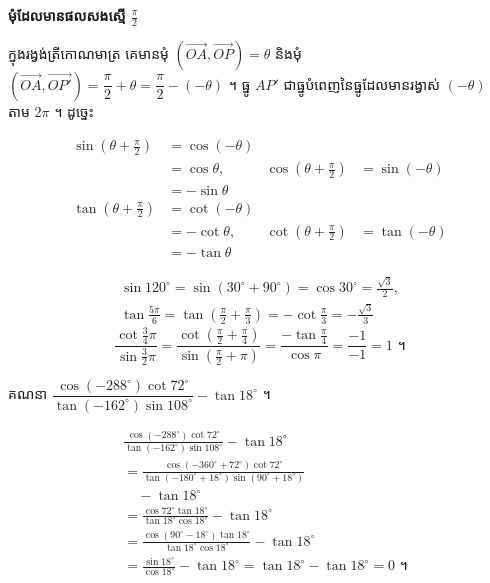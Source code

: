 \textbf{មុំដែលមានផលសងស្មើ $\frac{\pi}{2}$}

ក្នុងរង្វង់ត្រីកោណមាត្រ គេមានមុំ $(\overrightarrow{OA}, \overrightarrow{OP}) = \theta$ និងមុំ $(\overrightarrow{OA}, \overrightarrow{OP'}) = \dfrac{\pi}{2} + \theta = \dfrac{\pi}{2} - (-\theta)$ ។ ធ្នូ $AP'$ ជាធ្នូបំពេញនៃធ្នូដែលមានរង្វាស់ $(-\theta)$ តាម $2\pi$ ។ ដូច្នេះ
\begin{formulaBox}[រូបមន្ត]
\[
\begin{aligned}
\sin\left(\theta + \frac{\pi}{2}\right) &= \cos(-\theta)\\
&= \cos\theta, & \cos\left(\theta + \frac{\pi}{2}\right) &= \sin(-\theta)\\
&= -\sin\theta\\
\tan\left(\theta + \frac{\pi}{2}\right) &= \cot(-\theta)\\
&= -\cot\theta, & \cot\left(\theta + \frac{\pi}{2}\right) &= \tan(-\theta)\\
&= -\tan\theta
\end{aligned}
\]
\end{formulaBox}
\begin{example}[ឧទាហរណ៍]
\[
\begin{gathered}
\sin 120^\circ = \sin(30^\circ + 90^\circ) = \cos 30^\circ = \frac{\sqrt{3}}{2},\\
\tan\frac{5\pi}{6} = \tan\left(\frac{\pi}{2} + \frac{\pi}{3}\right) = -\cot\frac{\pi}{3} = -\frac{\sqrt{3}}{3}
\end{gathered}
\]
\[ \frac{\cot\frac{3}{4}\pi}{\sin\frac{3}{2}\pi} = \frac{\cot\left(\frac{\pi}{2} + \frac{\pi}{4}\right)}{\sin\left(\frac{\pi}{2} + \pi\right)} = \frac{-\tan\frac{\pi}{4}}{\cos\pi} = \frac{-1}{-1} = 1 \text{ ។} \]
\end{example}

\begin{example}[លំហាត់គំរូ ៩]
គណនា $\dfrac{\cos(-288^\circ)\cot 72^\circ}{\tan(-162^\circ)\sin 108^\circ} - \tan 18^\circ$ ។
\end{example}
\ans
\[
\begin{aligned}
&\frac{\cos(-288^\circ)\cot 72^\circ}{\tan(-162^\circ)\sin 108^\circ} - \tan 18^\circ\\
&= \frac{\cos(-360^\circ + 72^\circ)\cot 72^\circ}{\tan(-180^\circ + 18^\circ)\sin(90^\circ + 18^\circ)}\\
&\quad - \tan 18^\circ\\
&= \frac{\cos 72^\circ \tan 18^\circ}{\tan 18^\circ \cos 18^\circ} - \tan 18^\circ\\
&= \frac{\cos(90^\circ - 18^\circ)\tan 18^\circ}{\tan 18^\circ \cos 18^\circ} - \tan 18^\circ\\
&= \frac{\sin 18^\circ}{\cos 18^\circ} - \tan 18^\circ = \tan 18^\circ - \tan 18^\circ = 0 \text{ ។}
\end{aligned}
\]

